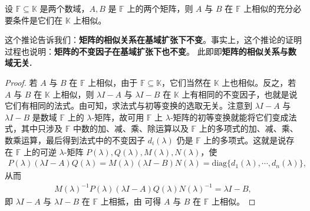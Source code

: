 \documentclass[../../main.tex]{subfiles}%
\begin{document}
\begin{corollary}[矩阵的相似关系在基域扩张下不变]\label{corollary:矩阵的相似关系在基域扩张下不变}
设 $\mathbb{F}\subseteq\mathbb{K}$ 是两个数域，$A, B$ 是 $\mathbb{F}$ 上的两个矩阵，则 $A$ 与 $B$ 在 $\mathbb{F}$ 上相似的充分必要条件是它们在 $\mathbb{K}$ 上相似。
\end{corollary}
\begin{note}
这个推论告诉我们：\textbf{矩阵的相似关系在基域扩张下不变}。事实上，这个推论的证明过程也说明：\textbf{矩阵的不变因子在基域扩张下也不变}。 此即即\textbf{矩阵的相似关系与数域无关.}
\end{note}
\begin{proof}

若 $A$ 与 $B$ 在 $\mathbb{F}$ 上相似，由于 $\mathbb{F}\subseteq\mathbb{K}$，它们当然在 $\mathbb{K}$ 上也相似。反之，若 $A$ 与 $B$ 在 $\mathbb{K}$ 上相似，则 $\lambda I - A$ 与 $\lambda I - B$ 在 $\mathbb{K}$ 上有相同的不变因子，也就是说它们有相同的法式。由可知，求法式与初等变换的选取无关。注意到 $\lambda I - A$ 与 $\lambda I - B$ 是数域 $\mathbb{F}$ 上的 $\lambda$-矩阵，故可用 $\mathbb{F}$ 上 $\lambda$-矩阵的初等变换就能将它们变成法式，其中只涉及 $\mathbb{F}$ 中数的加、减、乘、除运算以及 $\mathbb{F}$ 上的多项式的加、减、乘、数乘运算，最后得到法式中的不变因子 $d_i(\lambda)$ 仍是 $\mathbb{F}$ 上的多项式。这就是说存在 $\mathbb{F}$ 上的可逆 $\lambda$-矩阵 $P(\lambda), Q(\lambda), M(\lambda), N(\lambda)$，使
\begin{align*}
P(\lambda)(\lambda I - A)Q(\lambda)=M(\lambda)(\lambda I - B)N(\lambda)=\mathrm{diag}\{d_1(\lambda),\cdots,d_n(\lambda)\},
\end{align*}
从而
\begin{align*}
M(\lambda)^{-1}P(\lambda)(\lambda I - A)Q(\lambda)N(\lambda)^{-1}=\lambda I - B,
\end{align*}
即 $\lambda I - A$ 与 $\lambda I - B$ 在 $\mathbb{F}$ 上相抵，由 可得 $A$ 与 $B$ 在 $\mathbb{F}$ 上相似。

\end{proof}
\end{document}
